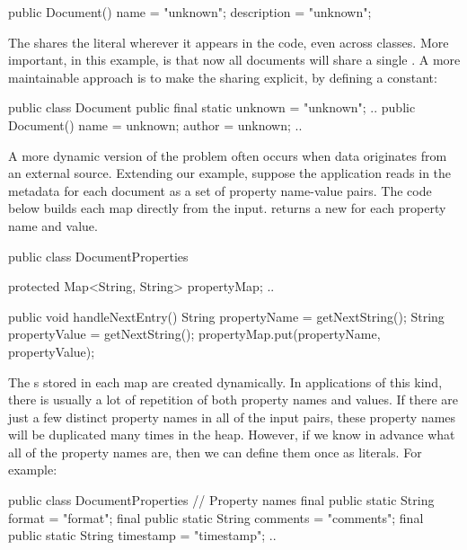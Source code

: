 \begin{shortlisting}
	public Document() {
		name = "unknown";
		description = "unknown";
	}
\end{shortlisting}

The \jre shares the  literal wherever it appears in
the code, even across classes. More important, in this example, is that now all
documents will share a single . A more maintainable
approach is to make the sharing explicit, by defining a  constant:

\begin{shortlisting}
	public class Document {
		public final static unknown = "unknown";
		..
		public Document() {
			name = unknown;
			author = unknown;
			..
		}
	}
\end{shortlisting}

A more dynamic version of the problem often occurs when data originates from 
an external source. Extending our example, suppose the
application reads in the metadata for each document as a set of property
name-value pairs. The code below builds each map directly from the
input.  returns a new
 for each property name and value.

\begin{shortlisting}
	public class DocumentProperties {
		protected Map<String, String> propertyMap;
		..
		
		public void handleNextEntry() {
			String propertyName = getNextString();  
			String propertyValue = getNextString();
			propertyMap.put(propertyName, propertyValue);
		}
	}
\end{shortlisting}

The s stored in each map are created dynamically.
In applications of this kind, there is usually a lot of repetition of both
property names and values. If there are just a few distinct property names in all of the input pairs, these
property names will be duplicated many times in the heap.
However, if we know in advance what all of the property names are,
then we can define them once as  literals. For example:

\begin{shortlisting}
	public class DocumentProperties {
		// Property names
		final public static String format = "format";
		final public static String comments = "comments";
		final public static String timestamp = "timestamp";
		..
	}
\end{shortlisting}

